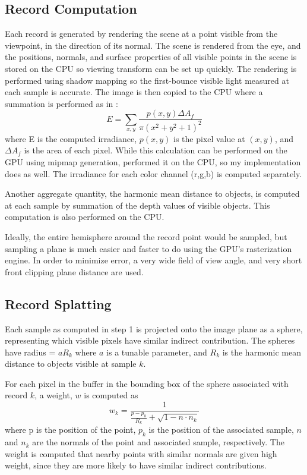 \documentclass[10pt,twopage]{acmsiggraph}
\begin{document}
\subsection{Record Computation}
Each record is generated by rendering the scene at a point visible from the viewpoint, in the direction of its normal.  The scene is rendered from the eye, and the positions, normals, and surface properties of all visible points in the scene is stored on the CPU so viewing transform can be set up quickly.  The rendering is performed using shadow mapping so the first-bounce visible light measured at each sample is accurate.  The image is then copied to the CPU where a summation is performed as in \cite{lco4}: 
$$
E = \sum_{x,y}\frac{p(x,y)\Delta A_f}{\pi(x^2 + y^2 +1)^2}
$$
where E is the computed irradiance, $p(x,y)$ is the pixel value at $(x,y)$,  and $\Delta A_f$ is the area of each pixel.  While this calculation can be performed on the GPU using mipmap generation, \cite{mainpaper} performed it on the CPU, so my implementation does as well.  The irradiance for each color channel (r,g,b) is computed separately.

Another aggregate quantity, the harmonic mean distance to objects, is computed at each sample by summation of the depth values of visible objects.  This computation is also performed on the CPU.

Ideally, the entire hemisphere around the record point would be sampled, but sampling a plane is much easier and faster to do using the GPU's rasterization engine.  In order to minimize error, a very wide field of view angle, and very short front clipping plane distance are used.    

\subsection{Record Splatting}
Each sample as computed in step 1 is projected onto the image plane as a sphere, representing which visible pixels have similar indirect contribution.  The spheres have radius = $aR_k$ where $a$ is a tunable parameter, and $R_k$ is the harmonic mean distance to objects visible at sample $k$.

For each pixel in the buffer in the bounding box of the sphere associated with record $k$, a weight, $w$ is computed as
$$
w_k = \frac{1}{\frac{p - p_k}{R_k} + \sqrt{1 - n \cdot n_k}}
$$
where p is the position of the point, $p_k$ is the position of the associated sample, $n$ and $n_k$ are the normals of the point and associated sample, respectively.  The weight is computed that nearby points with similar normals are given high weight, since they are more likely to have similar indirect contributions.
\end{document}
